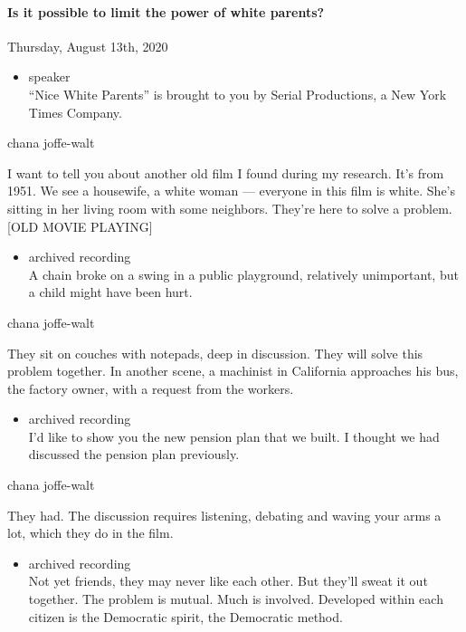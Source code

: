 \hypertarget{is-it-possible-to-limit-the-power-of-white-parents-2}{%
\paragraph{Is it possible to limit the power of white
parents?}\label{is-it-possible-to-limit-the-power-of-white-parents-2}}

Thursday, August 13th, 2020

\begin{itemize}
\tightlist
\item
  speaker\\
  ``Nice White Parents'' is brought to you by Serial Productions, a New
  York Times Company.
\end{itemize}

chana joffe-walt

I want to tell you about another old film I found during my research.
It's from 1951. We see a housewife, a white woman --- everyone in this
film is white. She's sitting in her living room with some neighbors.
They're here to solve a problem. {[}OLD MOVIE PLAYING{]}

\begin{itemize}
\tightlist
\item
  archived recording\\
  A chain broke on a swing in a public playground, relatively
  unimportant, but a child might have been hurt.
\end{itemize}

chana joffe-walt

They sit on couches with notepads, deep in discussion. They will solve
this problem together. In another scene, a machinist in California
approaches his bus, the factory owner, with a request from the workers.

\begin{itemize}
\tightlist
\item
  archived recording\\
  I'd like to show you the new pension plan that we built. I thought we
  had discussed the pension plan previously.
\end{itemize}

chana joffe-walt

They had. The discussion requires listening, debating and waving your
arms a lot, which they do in the film.

\begin{itemize}
\tightlist
\item
  archived recording\\
  Not yet friends, they may never like each other. But they'll sweat it
  out together. The problem is mutual. Much is involved. Developed
  within each citizen is the Democratic spirit, the Democratic method.
\end{itemize}

